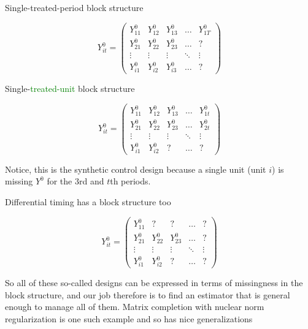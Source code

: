 \documentclass{beamer}
\begin{document}
\begin{frame}{Single-treated-period block structure}

\begin{center}
\[ Y^0_{it}  =\begin{pmatrix}
    Y^0_{11} & Y^0_{12} & Y^0_{13} & \dots  &Y^0_{1T} \\
    Y^0_{21} & Y^0_{22} & Y^0_{23} & \dots  & ? \\
    \vdots & \vdots & \vdots & \ddots & \vdots \\
    Y^0_{i1} & Y^0_{i2} & Y^0_{i3} & \dots  & ?
\end{pmatrix}\]
\end{center}

\end{frame}


\begin{frame}{Single-\textcolor{green}{treated-unit} block structure}

\begin{center}
\[ Y^0_{it}  =\begin{pmatrix}
    Y^0_{11} & Y^0_{12} & Y^0_{13} & \dots  & Y^0_{1t} \\
    Y^0_{21} & Y^0_{22} & Y^0_{23} & \dots  & Y^0_{2t}  \\
    \vdots & \vdots & \vdots & \ddots & \vdots \\
    Y^0_{i1} & Y^0_{i2} & ? & \dots  & ?
\end{pmatrix}\]
\end{center}

Notice, this is the synthetic control design because a single unit (unit $i$) is missing $Y^0$ for the 3rd and $t$th periods.

\end{frame}

\begin{frame}{Differential timing has a block structure too}

\begin{center}
\[ Y^0_{it}  =\begin{pmatrix}
    Y^0_{11} & ? & ? & \dots  & ? \\
    Y^0_{21} & Y^0_{22} & Y^0_{23} & \dots  & ? \\
    \vdots & \vdots & \vdots & \ddots & \vdots \\
    Y^0_{i1} & Y^0_{i2} & ? & \dots  & ?
\end{pmatrix}\]
\end{center}

So all of these so-called designs can be expressed in terms of missingness in the block structure, and our job therefore is to find an estimator that is general enough to manage all of them.  Matrix completion with nuclear norm regularization is one such example and so has nice generalizations

\end{frame}
\end{document}
